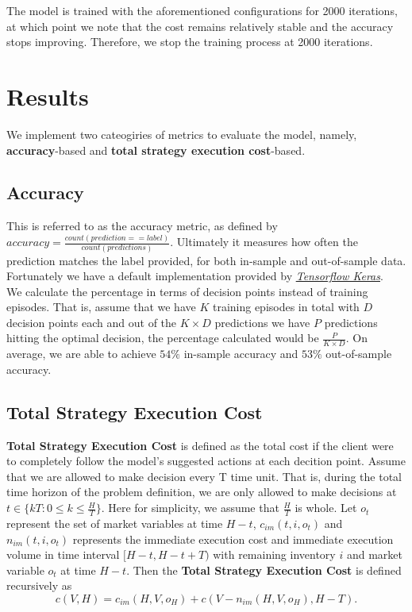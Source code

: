 \documentclass[12pt]{extarticle}
\begin{document}
\noindent The model is trained with the aforementioned configurations for 2000 iterations,
at which point we note that the cost remains relatively stable and the accuracy stops
improving. Therefore, we stop the training process at 2000 iterations.

\section{Results} \label{results}

We implement two cateogiries of metrics to evaluate the model, namely, \textbf{accuracy}-based
and \textbf{total strategy execution cost}-based.

\subsection{Accuracy}
This is referred to as the accuracy metric, as defined by
$\textit{accuracy} = \frac{\textit{count}(\textit{prediction} == \textit{label})}{\textit{count}(\textit{predictions})}.$
Ultimately it measures how often the prediction matches the label provided, for both in-sample and out-of-sample data.
Fortunately we have a default implementation provided by
\href{https://github.com/tensorflow/tensorflow/blob/r1.13/tensorflow/python/ops/metrics_impl.py}{\textit{Tensorflow Keras}}. \\


\noindent We calculate the percentage in terms of decision points instead of training episodes. That is,
assume that we have $K$ training episodes in total with $D$ decision points each and
out of the $K \times D$ predictions we have $P$ predictions hitting the optimal decision,
the percentage calculated would be $\frac{P}{K \times D}$. On average, we are able to achieve
$54\%$ in-sample accuracy and $53\%$ out-of-sample accuracy.


\subsection{Total Strategy Execution Cost} \label{tsec}
\textbf{Total Strategy Execution Cost} is defined as the total cost if the client were to
completely follow the model's suggested actions at each decition point. Assume that
we are allowed to make decision every T time unit. That is, during the total time horizon
of the problem definition, we are only allowed to make decisions at $t \in \{ kT: 0 \le k \le \frac{H}{T} \}$.
Here for simplicity, we assume that $\frac{H}{T}$ is whole. Let $o_t$ represent the set
of market variables at time $H - t$, $c_{im}(t, i, o_t)$ and $n_{im}(t, i, o_t)$ represents the immediate execution cost and
immediate execution volume in time interval $[H-t, H-t+T)$ with remaining inventory $i$ and market variable $o_t$ at time $H - t$.
Then the \textbf{Total Strategy Execution Cost} is defined recursively as
$$c(V, H) = c_{im}(H, V, o_H) + c(V - n_{im}(H, V, o_H), H - T).$$
\end{document}
